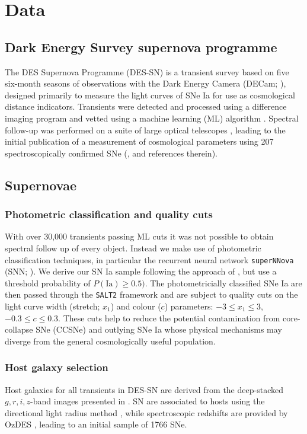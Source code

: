 \documentclass[fleqn,usenatbib]{mnras}
\begin{document}
\section{Data \label{sec:data}}
\subsection{Dark Energy Survey supernova programme \label{subsec:des}}
The DES Supernova Programme (DES-SN) is a transient survey based on five six-month seasons of observations with the Dark Energy Camera (DECam; \citealt{Flaugher2015}), designed primarily to measure the light curves of SNe Ia for use as cosmological distance indicators. Transients were detected and processed using a difference imaging program \citep{Kessler2015} and vetted using a machine learning (ML) algorithm \citep{Goldstein2015}. Spectral follow-up was performed on a suite of large optical telescopes \citet{Smith2020b}, leading to the initial publication of a measurement of cosmological parameters using 207 spectroscopically confirmed SNe (\citealt{DESCollaboration2018a}, and references therein). 
\subsection{Supernovae \label{subsec:host_sample}}
\subsubsection{Photometric classification and quality cuts \label{subsubsec:sn_classify}}
With over 30,000 transients passing ML cuts it was not possible to obtain spectral follow up of every object. Instead we make use of photometric classification techniques, in particular the recurrent neural network \texttt{superNNova} (SNN; \citealt{Moller2019}). We derive our SN Ia sample following the approach of \citet{Scolnic2020}, but use a threshold probability of $P(\mathrm{Ia})\geq0.5)$. The photometricially classified SNe Ia are then passed through the \texttt{SALT2} framework \citep{Betoule2014} and are subject to quality cuts on the light curve width (stretch; $x_1$) and colour ($c$) parameters: $-3 \leq x_1 \leq 3$, $-0.3 \leq c \leq 0.3$. These cuts help to reduce the potential contamination from core-collapse SNe (CCSNe) and outlying SNe Ia whose physical mechanisms may diverge from the general cosmologically useful population.

\subsubsection{Host galaxy selection \label{subsubsec:sn_hosts}}
Host galaxies for all transients in DES-SN are derived from the deep-stacked $g, r, i, z$-band images presented in \citet{Wiseman2020}. SN are associated to hosts using the directional light radius method \citep[e.g.][]{Sullivan2006,Gupta2016}, while spectroscopic redshifts are provided by OzDES \citep{Yuan2015,Childress2017,Lidman2020}, leading to an initial sample of 1766 SNe.
\end{document}
